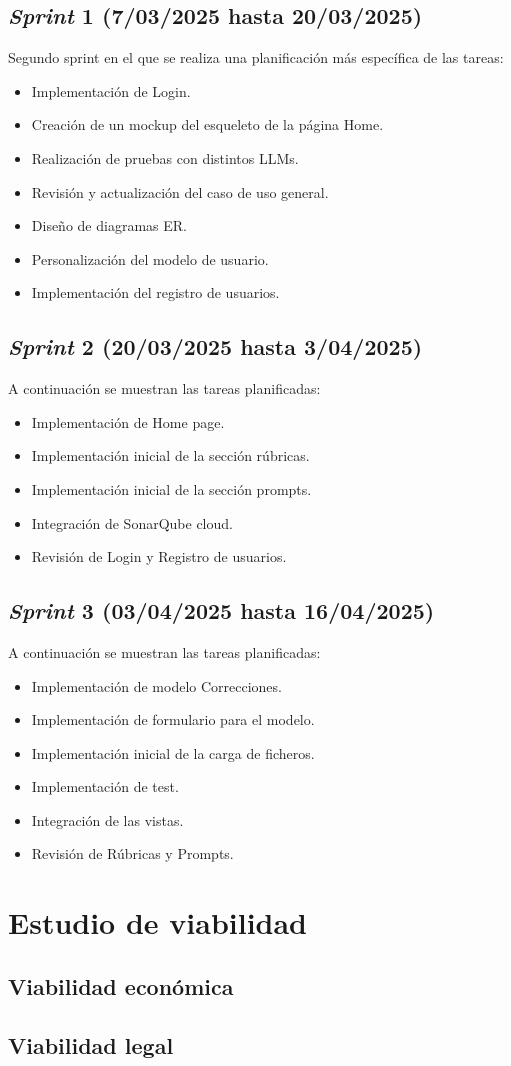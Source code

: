 \subsection{\emph{Sprint} 1 (7/03/2025 hasta 20/03/2025)}
Segundo sprint en el que se realiza una planificación más específica de las tareas:
\begin{itemize}
    \item Implementación de Login.
    \item Creación de un mockup del esqueleto de la página Home.
    \item Realización de pruebas con distintos LLMs.
    \item Revisión y actualización del caso de uso general.
    \item Diseño de diagramas ER.
    \item Personalización del modelo de usuario.
    \item Implementación del registro de usuarios.
\end{itemize}

\subsection{\emph{Sprint} 2 (20/03/2025 hasta 3/04/2025)}
A continuación se muestran las tareas planificadas:
\begin{itemize}
    \item Implementación de Home page.
    \item Implementación inicial de la sección rúbricas.
    \item Implementación inicial de la sección prompts.
    \item Integración de SonarQube cloud.
    \item Revisión de Login y Registro de usuarios.
\end{itemize}

\subsection{\emph{Sprint} 3 (03/04/2025 hasta 16/04/2025)}
A continuación se muestran las tareas planificadas:
\begin{itemize}
    \item Implementación de modelo Correcciones.
    \item Implementación de formulario para el modelo.
    \item Implementación inicial de la carga de ficheros.
    \item Implementación de test.
    \item Integración de las vistas.
    \item Revisión de Rúbricas y Prompts.
\end{itemize}


\section{Estudio de viabilidad}

\subsection{Viabilidad económica}

\subsection{Viabilidad legal}


